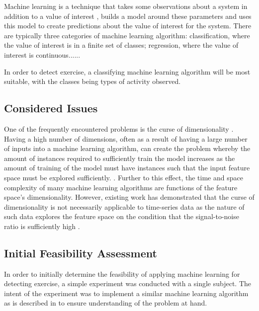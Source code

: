 \label{ml}

Machine learning is a technique that takes some observations about a system in addition to a value of interest , builds a model around these parameters and uses this model to create predictions about the value of interest for the system. There are typically three categories of machine learning algorithm: classification, where the value of interest is in a finite set of classes; regression, where the value of interest is continuous...... \todo{}

In order to detect exercise, a classifying machine learning algorithm will be most suitable, with the classes being types of activity observed.

\subsection{Considered Issues}

One of the frequently encountered problems is the curse of dimensionality \cite{bellman1957dynamic}. Having a high number of dimensions, often as a result of having a large number of inputs into a machine learning algorithm, can create the problem whereby the amount of instances required to sufficiently train the model increases as the amount of training of the model must have instances such that the input feature space must be explored sufficiently. \cite{oommen2008objective}. Further to this effect, the time and space complexity of many machine learning algorithms are functions of the feature space's dimensionality. However, existing work has demonstrated that the curse of dimensionality is not necessarily applicable to time-series data as the nature of such data explores the feature space on the condition that the signal-to-noise ratio is sufficiently high \cite{bernecker2011quality}.


\subsection{Initial Feasibility Assessment}
In order to initially determine the feasibility of applying machine learning for detecting exercise, a simple experiment was conducted with a single subject. The intent of the experiment was to implement a similar machine learning algorithm as is described in \cite{kwapisz2011activity} to ensure understanding of the problem at hand.

